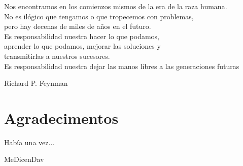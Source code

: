 %
%
%
%
%
%




\thispagestyle{empty}
\vspace*{0.4\textwidth}

\begin{FraseCelebreCentrada}
  \begin{FraseCentrada}
    Nos encontramos en los comienzos mismos de la era de la raza humana.\\
    No es ilógico que tengamos o que tropecemos con problemas, \\
    pero hay decenas de miles de años en el futuro. \\
    Es responsabilidad nuestra hacer lo que podamos, \\
    aprender lo que podamos, mejorar las soluciones y \\
    transmitirlas a nuestros sucesores. \\
    Es responsabilidad nuestra dejar las manos libres a las generaciones futuras
  \end{FraseCentrada}
  \begin{FuenteCentrada}
    Richard P. Feynman
  \end{FuenteCentrada}
\end{FraseCelebreCentrada}

\newpage

\thispagestyle{fancy}
\chapter*{Agradecimentos}
\begin{FraseCelebre}
  \begin{Frase}
    Había una vez...
  \end{Frase}
  \begin{Fuente}
    MeDicenDav
  \end{Fuente}
\end{FraseCelebre}


